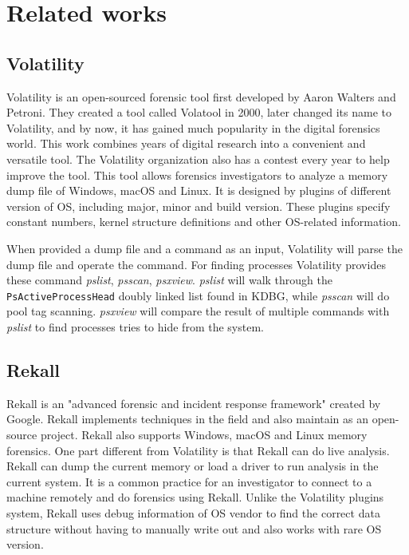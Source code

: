 \chapter[Related works]{Related works}

\section[Volatility]{Volatility}

Volatility \cite{volatility} is an open-sourced forensic tool first developed by Aaron Walters and Petroni. They created a tool called Volatool in 2000, later changed its name to Volatility, and by now, it has gained much popularity in the digital forensics world. This work combines years of digital research into a convenient and versatile tool. The Volatility organization also has a contest every year to help improve the tool. This tool allows forensics investigators to analyze a memory dump file of Windows, macOS and Linux. It is designed by plugins of different version of OS, including major, minor and build version. These plugins specify constant numbers, kernel structure definitions and other OS-related information.

When provided a dump file and a command as an input, Volatility will parse the dump file and operate the command. For finding processes Volatility provides these command \textit{pslist}, \textit{psscan}, \textit{psxview}. \textit{pslist} will walk through the \texttt{PsActiveProcessHead} doubly linked list found in KDBG, while \textit{psscan} will do pool tag scanning. \textit{psxview} will compare the result of multiple commands with \textit{pslist} to find processes tries to hide from the system.

\section[Rekall]{Rekall}

Rekall \cite{rekall} is an "advanced forensic and incident response framework" created by Google. Rekall implements techniques in the field and also maintain as an open-source project. Rekall also supports Windows, macOS and Linux memory forensics. One part different from Volatility is that Rekall can do live analysis. Rekall can dump the current memory or load a driver to run analysis in the current system. It is a common practice for an investigator to connect to a machine remotely and do forensics using Rekall. Unlike the Volatility plugins system, Rekall uses debug information of OS vendor to find the correct data structure without having to manually write out and also works with rare OS version.

